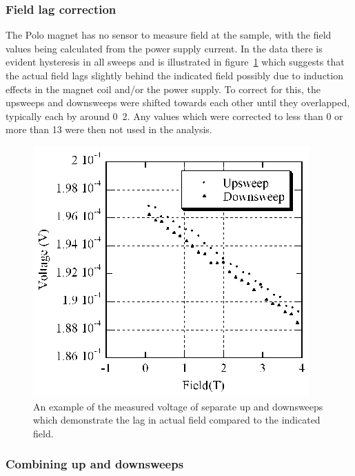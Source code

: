 \subsubsection{Field lag correction}

The Polo magnet has no sensor to measure field at the sample, with the field values being calculated from the power supply current. In the data there is evident hysteresis in all sweeps and is illustrated in figure~\ref{Fig:Exp:PoloHysteresis} which suggests that the actual field lags slightly behind the indicated field possibly due to induction effects in the magnet coil and/or the power supply. To correct for this, the upsweeps and downsweeps were shifted towards each other until they overlapped, typically each by around \unit{0.2}{\tesla}. Any values which were corrected to less than \unit{0}{\tesla} or more than \unit{13}{\tesla} were then not used in the analysis.
\begin{figure}[htbp]
    \begin{center}
        \includegraphics[scale=1.1]{Chapter-ExperimentalTechnique/Figures/PoloHysteresis/PoloHysteresis}
        \caption{An example of the measured voltage of separate up and downsweeps which demonstrate the lag in actual field compared to the indicated field.}
        \label{Fig:Exp:PoloHysteresis}
    \end{center}
\end{figure}

\subsubsection{Combining up and downsweeps}


